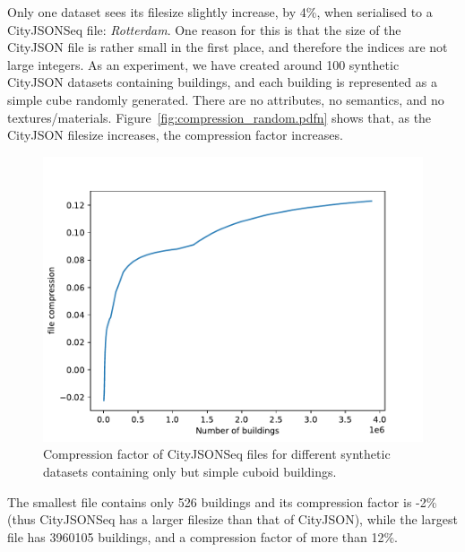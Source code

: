 \documentclass{isprs} %
\begin{document}
%

Only one dataset sees its filesize slightly increase, by 4\%, when serialised to a CityJSONSeq file: \emph{Rotterdam}.
One reason for this is that the size of the CityJSON file is rather small in the first place, and therefore the indices are not large integers.
As an experiment, we have created around 100 synthetic CityJSON datasets containing buildings, and each building is represented as a simple cube randomly generated.
There are no attributes, no semantics, and no textures/materials. 
Figure~\ref{fig:compression_random.pdfn} shows that, as the CityJSON filesize increases, the compression factor increases.
\begin{figure}
  \centering
  \includegraphics[width=\linewidth]{figs/compression_random.pdf}
  \caption{Compression factor of CityJSONSeq files for different synthetic datasets containing only but simple cuboid buildings.}%
\label{fig:compression_random}
\end{figure}
The smallest file contains only 526 buildings and its compression factor is -2\% (thus CityJSONSeq has a larger filesize than that of CityJSON), while the largest file has \num{3960105} buildings, and a compression factor of more than 12\%.

%
\end{document}
